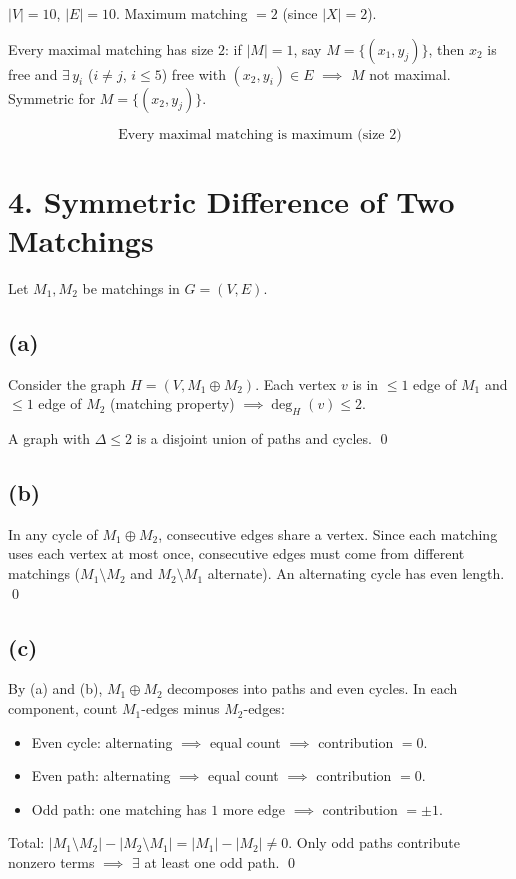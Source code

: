 \documentclass[11pt]{article}
\begin{document}
$|V| = 10$, $|E| = 10$. Maximum matching $= 2$ (since $|X| = 2$).

Every maximal matching has size $2$: if $|M| = 1$, say $M = \{(x_1, y_j)\}$, then $x_2$ is free and $\exists\, y_i$ ($i \ne j$, $i \le 5$) free with $(x_2, y_i) \in E$ $\implies$ $M$ not maximal. Symmetric for $M = \{(x_2, y_j)\}$.

\[\boxed{\text{Every maximal matching is maximum (size } 2\text{)}}\]


\section*{4. Symmetric Difference of Two Matchings}

Let $M_1, M_2$ be matchings in $G = (V, E)$.

\vspace{-10pt}
\subsection*{(a)}

Consider the graph $H = (V, M_1 \oplus M_2)$. Each vertex $v$ is in $\le 1$ edge of $M_1$ and $\le 1$ edge of $M_2$ (matching property) $\implies \deg_H(v) \le 2$.

A graph with $\Delta \le 2$ is a disjoint union of paths and cycles. \qed

\vspace{-20pt}
\subsection*{(b)}

In any cycle of $M_1 \oplus M_2$, consecutive edges share a vertex. Since each matching uses each vertex at most once, consecutive edges must come from different matchings ($M_1 \setminus M_2$ and $M_2 \setminus M_1$ alternate). An alternating cycle has even length. \qed

\vspace{-20pt}
\subsection*{(c)}

By (a) and (b), $M_1 \oplus M_2$ decomposes into paths and even cycles. In each component, count $M_1$-edges minus $M_2$-edges:
\begin{itemize}[leftmargin=*,itemsep=2pt]
\item Even cycle: alternating $\implies$ equal count $\implies$ contribution $= 0$.
\item Even path: alternating $\implies$ equal count $\implies$ contribution $= 0$.
\item Odd path: one matching has $1$ more edge $\implies$ contribution $= \pm 1$.
\end{itemize}

Total: $|M_1 \setminus M_2| - |M_2 \setminus M_1| = |M_1| - |M_2| \ne 0$. Only odd paths contribute nonzero terms $\implies$ $\exists$ at least one odd path. \qed
\end{document}
